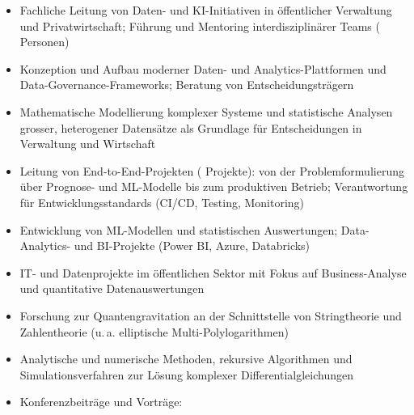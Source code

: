 \documentclass{cv}
\begin{document}
	\newpage


	\begin{itemize}
		\item Fachliche Leitung von Daten- und KI-Initiativen in öffentlicher Verwaltung und Privatwirtschaft; Führung und Mentoring interdisziplinärer Teams ( Personen)
		\item Konzeption und Aufbau moderner Daten- und Analytics-Plattformen und Data-Governance-Frameworks; Beratung von Entscheidungsträgern
	\end{itemize}

	\begin{itemize}
		\item Mathematische Modellierung komplexer Systeme und statistische Analysen grosser, heterogener Datensätze als Grundlage für Entscheidungen in Verwaltung und Wirtschaft
		\item Leitung von End-to-End-Projekten ( Projekte): von der Problemformulierung über Prognose- und ML-Modelle bis zum produktiven Betrieb; Verantwortung für Entwicklungsstandards (CI/CD, Testing, Monitoring)
	\end{itemize}

	\begin{itemize}
		\item Entwicklung von ML-Modellen und statistischen Auswertungen; Data-Analytics- und BI-Projekte (Power BI, Azure, Databricks)
	\end{itemize}

	\begin{itemize}
		\item IT- und Datenprojekte im öffentlichen Sektor mit Fokus auf Business-Analyse und quantitative Datenauswertungen
	\end{itemize}


	\begin{itemize}
		\item Forschung zur Quantengravitation an der Schnittstelle von Stringtheorie und Zahlentheorie (u.\,a. elliptische Multi-Polylogarithmen)
		\item Analytische und numerische Methoden, rekursive Algorithmen und Simulationsverfahren zur Lösung komplexer Differentialgleichungen
		\item Konferenzbeiträge und Vorträge: 
	\end{itemize}
\end{document}

